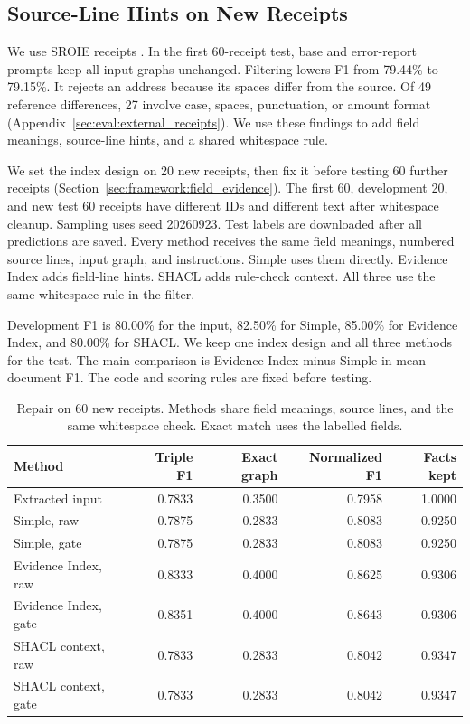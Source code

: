 \subsection{Source-Line Hints on New Receipts}
\label{sec:eval:receipt_followup}

We use SROIE receipts \citep{ref_sroie2019}.
In the first 60-receipt test, base and error-report prompts keep all input
graphs unchanged. Filtering lowers F1 from 79.44\% to 79.15\%.
It rejects an address because its spaces differ from the source.
Of 49 reference differences, 27 involve case, spaces, punctuation, or amount
format (Appendix~\ref{sec:eval:external_receipts}). We use these findings to
add field meanings, source-line hints, and a shared whitespace rule.

We set the index design on 20 new receipts, then fix it before testing 60
further receipts (Section~\ref{sec:framework:field_evidence}).
The first 60, development 20, and new test 60 receipts have different IDs
and different text after whitespace cleanup. Sampling uses seed 20260923.
Test labels are downloaded after all predictions are saved.
Every method receives the same field meanings, numbered source lines,
input graph, and instructions. Simple uses them directly.
Evidence Index adds field-line hints. SHACL adds rule-check context.
All three use the same whitespace rule in the filter.

Development F1 is 80.00\% for the input, 82.50\% for Simple,
85.00\% for Evidence Index, and 80.00\% for SHACL.
We keep one index design and all three methods for the test.
The main comparison is Evidence Index minus Simple in mean document F1.
The code and scoring rules are fixed before testing.

\begin{table}[t]
\centering
\caption{Repair on 60 new receipts. Methods share field meanings, source lines, and the same whitespace check. Exact match uses the labelled fields.}
\label{tab:receipt_followup}
\small
\begin{tabular}{lrrrr}
\toprule
Method & Triple F1 & Exact graph & Normalized F1 & Facts kept \\
\midrule
Extracted input & 0.7833 & 0.3500 & 0.7958 & 1.0000 \\
Simple, raw & 0.7875 & 0.2833 & 0.8083 & 0.9250 \\
Simple, gate & 0.7875 & 0.2833 & 0.8083 & 0.9250 \\
Evidence Index, raw & 0.8333 & 0.4000 & 0.8625 & 0.9306 \\
Evidence Index, gate & 0.8351 & 0.4000 & 0.8643 & 0.9306 \\
SHACL context, raw & 0.7833 & 0.2833 & 0.8042 & 0.9347 \\
SHACL context, gate & 0.7833 & 0.2833 & 0.8042 & 0.9347 \\
\bottomrule
\end{tabular}
\end{table}

